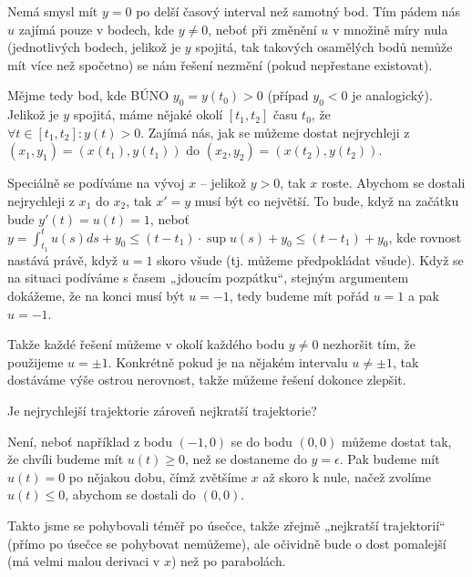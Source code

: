 \documentclass[12pt]{article}					%
\begin{document}
\begin{priklad}[I]
	\begin{dukazin}
		Nemá smysl mít $y = 0$ po delší časový interval než samotný bod. Tím pádem nás $u$ zajímá pouze v bodech, kde $y ≠ 0$, neboť při změnění $u$ v množině míry nula (jednotlivých bodech, jelikož je $y$ spojitá, tak takových osamělých bodů nemůže mít více než spočetno) se nám řešení nezmění (pokud nepřestane existovat).

		Mějme tedy bod, kde BÚNO $y_0 = y(t_0) > 0$ (případ $y_0 < 0$ je analogický). Jelikož je $y$ spojitá, máme nějaké okolí $[t_1, t_2]$ času $t_0$, že $\forall t \in [t_1, t_2]: y(t) > 0$. Zajímá nás, jak se můžeme dostat nejrychleji z $(x_1, y_1) = (x(t_1), y(t_1))$ do $(x_2, y_2) = (x(t_2), y(t_2))$.

		Speciálně se podíváme na vývoj $x$ – jelikož $y > 0$, tak $x$ roste. Abychom se dostali nejrychleji z $x_1$ do $x_2$, tak $x' = y$ musí být co největší. To bude, když na začátku bude $y'(t) = u(t) = 1$, neboť $y = \int_{t_1}^t u(s) ds + y_0 ≤ (t - t_1)·\sup{u(s)} + y_0 ≤ (t - t_1) + y_0$, kde rovnost nastává právě, když $u = 1$ skoro všude (tj. můžeme předpokládat všude). Když se na situaci podíváme s časem „jdoucím pozpátku“, stejným argumentem dokážeme, že na konci musí být $u = -1$, tedy budeme mít pořád $u = 1$ a pak $u = -1$.

		Takže každé řešení můžeme v okolí každého bodu $y ≠ 0$ nezhoršit tím, že použijeme $u = ±1$. Konkrétně pokud je na nějakém intervalu $u ≠ ±1$, tak dostáváme výše ostrou nerovnost, takže můžeme řešení dokonce zlepšit.
	\end{dukazin}

	Je nejrychlejší trajektorie zároveň nejkratší trajektorie?

	\begin{reseni}
		Není, neboť například z bodu $(-1, 0)$ se do bodu $(0, 0)$ můžeme dostat tak, že chvíli budeme mít $u(t) ≥ 0$, než se dostaneme do $y = \epsilon$. Pak budeme mít $u(t) = 0$ po nějakou dobu, čímž zvětšíme $x$ až skoro k nule, načež zvolíme $u(t) ≤ 0$, abychom se dostali do $(0, 0)$.

		Takto jsme se pohybovali téměř po úsečce, takže zřejmě „nejkratší trajektorií“ (přímo po úsečce se pohybovat nemůžeme), ale očividně bude o dost pomalejší (má velmi malou derivaci v $x$) než po parabolách.
	\end{reseni}
\end{priklad}
\end{document}
